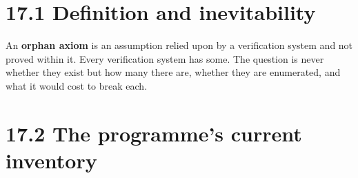 \documentclass[
  11pt]{report}
\begin{document}
\hypertarget{definition-and-inevitability}{%
\section{17.1 Definition and
inevitability}\label{definition-and-inevitability}}

An \textbf{orphan axiom} is an assumption relied upon by a verification
system and not proved within it. Every verification system has some. The
question is never whether they exist but how many there are, whether
they are enumerated, and what it would cost to break each.

\hypertarget{the-programmes-current-inventory}{%
\section{17.2 The programme's current
inventory}\label{the-programmes-current-inventory}}
\end{document}

